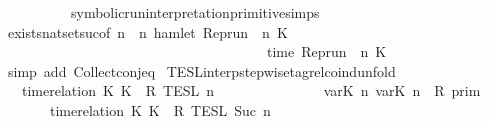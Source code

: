 \begin{isabellebody}
\ \ \ \ \ \ \ \ \ \ symbolic{\isacharunderscore}run{\isacharunderscore}interpretation{\isacharunderscore}primitive{\isachardot}simps{\isacharparenleft}{}{\isacharcomma}{}{\isacharparenright}\isanewline
{}\isamarkupfalse%
\ exists{\isacharunderscore}nat{\isacharunderscore}set{\isacharunderscore}suc{\isacharbrackleft}of\ {\isacartoucheopen}n{\isacartoucheclose}\ {\isacartoucheopen}{\isasymlambda}{\isasymrho}\ n{\isachardot}\ hamlet\ {\isacharparenleft}Rep{\isacharunderscore}run\ {\isasymrho}\ n\ K\isanewline
\ \ \ \ \ \ \ \ \ \ \ \ \ \ \ \ \ \ \ \ \ \ \ \ \ \ \ \ \ \ \ \ \ \ \ \ \ {\isasymand}\ time\ {\isacharparenleft}Rep{\isacharunderscore}run\ {\isasymrho}\ n\ K\ {\isacharequal}\ {\isasymtau}{\isacartoucheclose}{\isacharbrackright}\isanewline
{}\isamarkupfalse%
\ {\isacharparenleft}simp\ add{\isacharcolon}\ Collect{\isacharunderscore}conj{\isacharunderscore}eq{\isacharparenright}%
\endisatagproof
{\isafoldproof}%
%
\isadelimproof
\isanewline
%
\endisadelimproof
\isanewline
\isanewline
{}\isamarkupfalse%
\ TESL{\isacharunderscore}interp{\isacharunderscore}stepwise{\isacharunderscore}tagrel{\isacharunderscore}coind{\isacharunderscore}unfold{\isacharcolon}\isanewline
\ \ {\isacartoucheopen}{\isasymlbrakk}\ time{\isacharminus}relation\ {\isasymlfloor}K\ K\ {\isasymin}\ R\ {\isasymrbrakk}\isactrlsub T\isactrlsub E\isactrlsub S\isactrlsub L\isactrlbsup {\isasymge}\ n\isactrlesup \ {\isacharequal}\ \ \ \ \ \ \ \ %
\isanewline
\ \ \ \ \ {\isasymlbrakk}\ {\isasymlfloor}{\isasymtau}\isactrlsub v\isactrlsub a\isactrlsub r{\isacharparenleft}K\ n{\isacharparenright}{\isacharcomma}\ {\isasymtau}\isactrlsub v\isactrlsub a\isactrlsub r{\isacharparenleft}K\ n{\isacharparenright}{\isasymrfloor}\ {\isasymin}\ R\ {\isasymrbrakk}\isactrlsub p\isactrlsub r\isactrlsub i\isactrlsub m\isanewline
\ \ \ \ \ {\isasyminter}\ {\isasymlbrakk}\ time{\isacharminus}relation\ {\isasymlfloor}K\ K\ {\isasymin}\ R\ {\isasymrbrakk}\isactrlsub T\isactrlsub E\isactrlsub S\isactrlsub L\isactrlbsup {\isasymge}\ Suc\ n\isactrlesup {\isacartoucheclose}\isanewline
%
\isadelimproof
%
\endisadelimproof
%
\isatagproof
{}\isamarkupfalse%

\end{isabellebody}
